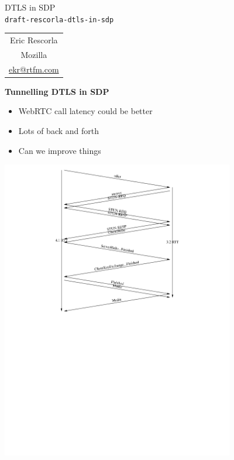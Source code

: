 \documentclass[helvetica]{seminar}
\newcommand{\heading}[1]{%
  \begin{center} 
    \large\bf 
    #1 
  \end{center} 
  \vspace{.4 in}}
\begin{document}
\begin{slide}
\begin{center}
\vspace{.5 in}
\LARGE{{\bf}DTLS in SDP\\{\small \verb^draft-rescorla-dtls-in-sdp^}}\\
\vspace{.2in}
\large{
\begin{tabular}{c}
Eric Rescorla\\
Mozilla\\
\url{ekr@rtfm.com}
\end{tabular}
}
\end{center}

\end{slide}

\centerslidesfalse 

\begin{slide}
\heading{Tunnelling DTLS in SDP}

\begin{itemize}
\item WebRTC call latency could be better
\item Lots of back and forth
\item Can we improve things
\end{itemize}
\end{slide}

\begin{slide}

\includegraphics[width=4in]{normal-12}

\end{slide}
\end{document}
